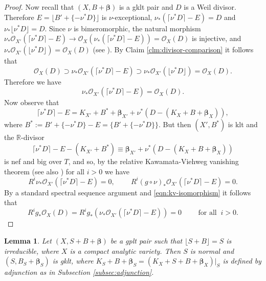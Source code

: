 \documentclass[12pt]{amsart}
\theoremstyle{plain}
\newtheorem{lemma}[theorem]{Lemma}
\theoremstyle{remark}
\theoremstyle{definition}
\newcommand{\<}{\leq}
\def\mcO{\mathcal{O}}
\newcommand{\OO}{{\mathcal{O}}}
\newcommand{\R}{{\mathbb{R}}}
\def\lrd{\lfloor}
\def\rrd{\rfloor}
\def\mcO{\mathcal{O}}
\def\lru{\lceil}
\def\rru{\rceil}
\def\lrd{\lfloor}
\def\rrd{\rfloor}
\def\bbeta{\boldsymbol{\beta}}
\theoremstyle{definition}
\theoremstyle{definition}
\numberwithin{equation}{section}
\theoremstyle{remark}
\begin{document}
\begin{proof}
Now recall that $(X, B+\bbeta)$ is a gklt pair and $D$ is a Weil divisor. Therefore $E=\lrd B'+\{-\nu^*D\}\rrd$  is $\nu$-exceptional, $\nu _* (\lceil \nu ^*D\rceil-E)=D$ and $\nu_*\lrd \nu^*D\rrd =D$. Since $\nu$ is bimeromorphic, the natural morphism $\nu_*\mcO_{X'}(\lru\nu^*D\rru-E)\to \mcO_X(\nu_*(\lru\nu^*D\rru-E))=\mcO_X(D)$ is injective, and $\nu_*\mcO_{X'}(\lrd\nu^*D\rrd)=\mcO_X(D)$ (see \cite[Lemma 3.2]{Das21}).  By Claim \ref{clm:divisor-comparison} it follows that
\[\OO _{X}(D)\supset \nu _* \OO _{X'}(\lceil \nu ^*D\rceil -E)\supset \nu _* \OO _{X'}(\lfloor \nu ^*D\rfloor)=\OO _X(D).\] 
Therefore we have
\begin{equation}\label{eqn:kv-isomorphism}
    \nu_*\mcO_{X'}(\lru\nu^*D\rru-E)=\mcO_X(D).
\end{equation}
 Now observe that 
 \[\lceil \nu ^*D\rceil -E= K_{X'}+B^*+\bbeta _{X'}+\nu ^*(D-(K_X+B+\bbeta_X)),\]
where $B^*:=B'+\{-\nu ^*D\}-E=\{B'+\{-\nu ^*D\}\}$. But then $(X',B^*)$ is klt and the $\R$-divisor \[\lceil \nu ^*D\rceil -E-(K_{X'}+B^*)\equiv \bbeta _{X'}+\nu ^*(D-(K_X+B+\bbeta _X))\] is  nef and big over $T$, and so, by the relative Kawamata-Viehweg vanishing theorem \cite[Theorem 3.7]{Nak87} (see also \cite[Theorem 5.2]{Fuj22}) for all $i>0$ we have 
\[R^i\nu _* \OO _{X'}(\lceil \nu ^*D\rceil -E)=0,\ \qquad R^i(g\circ \nu )_* \OO _{X'}(\lceil \nu ^*D\rceil -E)=0.\]
By a standard spectral sequence argument and \eqref{eqn:kv-isomorphism} it follows that 
\[R^ig_*\OO _X(D)=R^ig_* (\nu _* \OO _{X'}(\lceil \nu ^*D\rceil -E))=0\qquad \mbox{ for all } \ i>0.\]


\end{proof}








\begin{lemma}\label{lem:normality-of-plt-center}
    Let $(X, S+B+\bbeta)$ be a gplt pair such that $\lrd S+B\rrd=S$ is irreducible, where $X$ is a compact analytic variety. Then $S$ is normal and $(S, B_S+\bbeta_S)$ is gklt, where $K_S+B+\bbeta_S=(K_X+S+B+\bbeta_X)|_S$ is defined by adjunction as in Subsection \ref{subsec:adjunction}.
\end{lemma}
\end{document}
